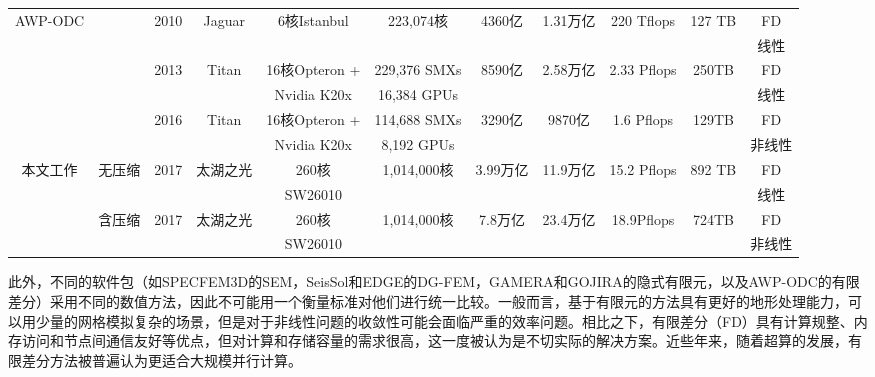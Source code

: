\begin{landscape}
\begin{table*}[ht]
{\begin{tabular}{ccccccccccc}
\multirow{6}{*}{AWP-ODC} & \multirow{2}{*}{\citep{cui2010scalable}} & \multirow{2}{*}{2010} & \multirow{2}{*}{Jaguar} & \multirow{2}{*}{6核Istanbul} & \multirow{2}{*}{223,074核} & \multirow{2}{*}{4360亿} & \multirow{2}{*}{1.31万亿} & \multirow{2}{*}{220 Tflops} & \multirow{2}{*}{127 TB} & FD \\
 & & & & & & & & & & 线性 \\ \cline{2-11}
 & \multirow{2}{*}{\citep{cui2013physics}} & \multirow{2}{*}{2013} & \multirow{2}{*}{Titan} & 16核Opteron + & 229,376 SMXs & \multirow{2}{*}{8590亿} & \multirow{2}{*}{2.58万亿} & \multirow{2}{*}{2.33 Pflops} & \multirow{2}{*}{250TB} & FD \\
 & & & & Nvidia K20x & 16,384 GPUs & & & & & 线性 \\ \cline{2-11}
 & \multirow{2}{*}{\citep{roten2016high}} & \multirow{2}{*}{2016} & \multirow{2}{*}{Titan} & 16核Opteron + & 114,688 SMXs & \multirow{2}{*}{3290亿} & \multirow{2}{*}{9870亿} & \multirow{2}{*}{1.6 Pflops} & \multirow{2}{*}{129TB} & FD \\
 & & & & Nvidia K20x & 8,192 GPUs & & & & & 非线性 \\ \hline\hline
\multirow{4}{*}{本文工作} & \multirow{2}{*}{无压缩} & \multirow{2}{*}{2017} & \multirow{2}{*}{太湖之光} & 260核 & \multirow{2}{*}{1,014,000核} & \multirow{2}{*}{3.99万亿} & \multirow{2}{*}{11.9万亿} & \multirow{2}{*}{15.2 Pflops} & \multirow{2}{*}{892 TB} & FD \\
 & & & & SW26010 & & & & & & 线性 \\ \cline{2-11}
 & \multirow{2}{*}{含压缩} & \multirow{2}{*}{2017} & \multirow{2}{*}{太湖之光} & 260核 & \multirow{2}{*}{1,014,000核} & \multirow{2}{*}{7.8万亿} & \multirow{2}{*}{23.4万亿} & \multirow{2}{*}{18.9Pflops} & \multirow{2}{*}{724TB} & FD \\
 & & & & SW26010 & & & & & & 非线性 \\\hline\hline
\end{tabular}
}
\end{table*}
\end{landscape}


此外，不同的软件包（如SPECFEM3D的SEM，SeisSol和EDGE的DG-FEM，GAMERA和GOJIRA的隐式有限元，以及AWP-ODC的有限差分）采用不同的数值方法，因此不可能用一个衡量标准对他们进行统一比较。一般而言，基于有限元的方法具有更好的地形处理能力，可以用少量的网格模拟复杂的场景，但是对于非线性问题的收敛性可能会面临严重的效率问题。相比之下，有限差分（FD）具有计算规整、内存访问和节点间通信友好等优点，但对计算和存储容量的需求很高，这一度被认为是不切实际的解决方案。近些年来，随着超算的发展，有限差分方法被普遍认为更适合大规模并行计算。

